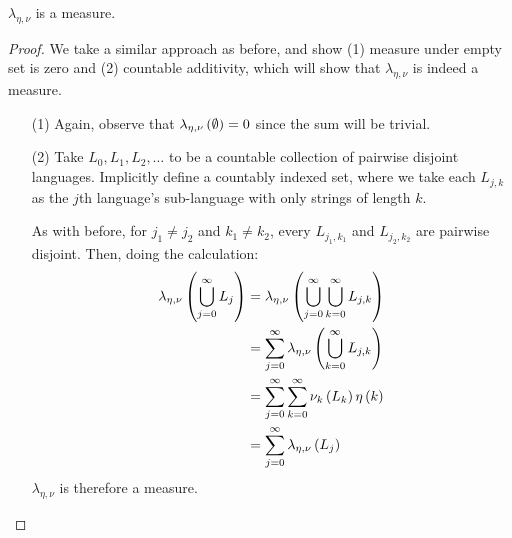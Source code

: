 \begin{theorem}
  \(\lambda_{\eta, \nu}\) is a measure.
\end{theorem}
\begin{proof}
  We take a similar approach as before, and show
  (1) measure under empty set is zero and
  (2) countable additivity,
  which will show that \(\lambda_{\eta, \nu}\) is indeed a measure.

  \begin{enumerate}
    \item[(1)]
      Again, observe that \(\lambda_{\eta, \nu} \left(\emptyset\right) = 0\)
      since the sum will be trivial.

    \item[(2)]
      Take \(L_0, L_1, L_2, \ldots\) to be a countable collection of
      pairwise disjoint languages.
      Implicitly define a countably indexed set,
      where we take each \(L_{j, k}\) as the \(j\)th language's
      sub-language with only strings of length \(k\).

      As with before, for \(j_1 \neq j_2\) and \(k_1 \neq k_2\),
      every \(L_{j_1, k_1}\) and \(L_{j_2, k_2}\) are pairwise disjoint.
      Then, doing the calculation:
      \begin{align*}
        \lambda_{\eta, \nu} \left(\bigcup_{j = 0}^{\infty} L_j\right)
          &= \lambda_{\eta, \nu} \left(\bigcup_{j = 0}^{\infty}
                            \bigcup_{k = 0}^{\infty} L_{j, k}\right) \\
          &= \sum_{j = 0}^{\infty}
              \lambda_{\eta, \nu} \left(\bigcup_{k = 0}^{\infty} L_{j, k}\right) \\
          &= \sum_{j = 0}^{\infty}
              \sum_{k = 0}^{\infty}
                \nu_k \left(L_k\right) \eta\left(k\right) \\
          &= \sum_{j = 0}^{\infty} \lambda_{\eta, \nu} \left(L_j\right)
        \end{align*}
      \(\lambda_{\eta, \nu}\) is therefore a measure.
  \end{enumerate}
\end{proof}


